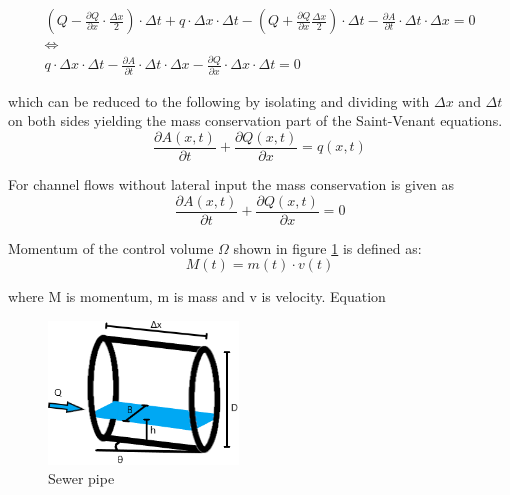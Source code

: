 \begin{equation}
\begin{array}{l}
	\left(Q - \frac{\partial Q}{\partial x}\cdot \frac{\Delta x}{2}\right) \cdot \Delta t + q \cdot \Delta x \cdot \Delta t - \left(Q + \frac{\partial Q}{ \partial x} \frac{\Delta x}{2} \right) \cdot \Delta t - \frac{\partial A}{\partial t}\cdot \Delta t 
	\cdot \Delta x = 0 \\ 
\Leftrightarrow \\
q \cdot \Delta x \cdot \Delta t -\frac{\partial A}{\partial t} \cdot \Delta t 
	\cdot \Delta x - \frac{\partial Q}{\partial x} \cdot \Delta x \cdot \Delta t  = 0 
\end{array}
\label{saintbernard_masse}
\end{equation}

which can be reduced to the following by isolating and dividing with $\Delta x$ and $\Delta t$ on both sides yielding the mass conservation part of the Saint-Venant equations.
\begin{equation}	
\frac{\partial A(x,t)}{\partial t} + \frac{\partial Q(x,t)}{\partial x}=q(x,t)
\label{saintbernard_mass_lateral}
\end{equation}

For channel flows without lateral input the mass conservation is given as
\begin{equation}	
\frac{\partial A(x,t)}{\partial t} + \frac{\partial Q(x,t)}{\partial x}=0
\label{saintbernard_mass}
\end{equation}

Momentum of the control volume $\Omega$ shown in figure \ref{fig:kloakroer} is defined as:
\begin{equation}
M(t) = m(t) \cdot v(t)
\label{eq:momentum_definition}
\end{equation}  

where M is momentum, m is mass and v is velocity. Equation




\begin{figure}[H]
\centering
\includegraphics[width=0.45\textwidth]{report/modeling/pictures/kloakroer.png}
\caption{Sewer pipe }
\label{fig:kloakroer}
\end{figure}








